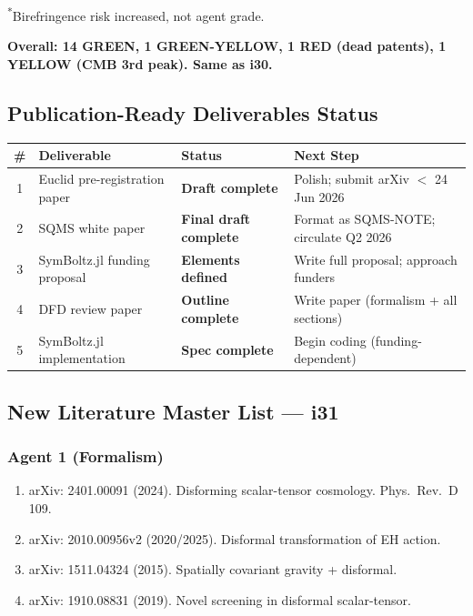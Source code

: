 \documentclass[11pt,a4paper]{article}
\begin{document}
\textsuperscript{*}Birefringence risk increased, not agent grade.

\textbf{Overall: 14 GREEN, 1 GREEN-YELLOW, 1 RED (dead patents), 1 YELLOW (CMB 3rd peak). Same as i30.}

\subsection{Publication-Ready Deliverables Status}

\begin{center}
\begin{longtable}{clll}
\toprule
\textbf{\#} & \textbf{Deliverable} & \textbf{Status} & \textbf{Next Step} \\
\midrule
\endfirsthead
1 & Euclid pre-registration paper & \textbf{Draft complete} & Polish; submit arXiv $<$ 24 Jun 2026 \\
2 & SQMS white paper & \textbf{Final draft complete} & Format as SQMS-NOTE; circulate Q2 2026 \\
3 & SymBoltz.jl funding proposal & \textbf{Elements defined} & Write full proposal; approach funders \\
4 & DFD review paper & \textbf{Outline complete} & Write paper (formalism + all sections) \\
5 & SymBoltz.jl implementation & \textbf{Spec complete} & Begin coding (funding-dependent) \\
\bottomrule
\end{longtable}
\end{center}

\subsection{New Literature Master List --- i31}

\subsubsection{Agent 1 (Formalism)}
\begin{enumerate}
\item arXiv: 2401.00091 (2024). Disforming scalar-tensor cosmology. Phys.\ Rev.\ D 109.
\item arXiv: 2010.00956v2 (2020/2025). Disformal transformation of EH action.
\item arXiv: 1511.04324 (2015). Spatially covariant gravity + disformal.
\item arXiv: 1910.08831 (2019). Novel screening in disformal scalar-tensor.
\end{enumerate}
\end{document}
